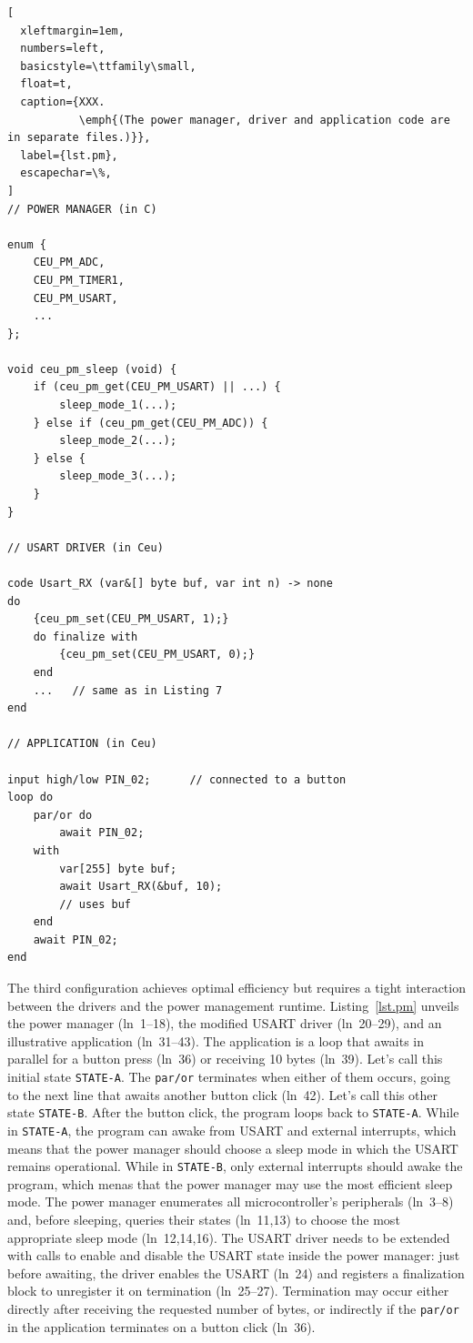 \documentclass[sigplan,10pt,review,anonymous]{acmart}\settopmatter{printfolios=true,printccs=false,printacmref=false}
\newcommand{\code}[1] {{\small{\texttt{#1}}}}
\begin{document}
\begin{lstlisting}[
  xleftmargin=1em,
  numbers=left,
  basicstyle=\ttfamily\small,
  float=t,
  caption={XXX.
           \emph{(The power manager, driver and application code are in separate files.)}},
  label={lst.pm},
  escapechar=\%,
]
// POWER MANAGER (in C)

enum {
    CEU_PM_ADC,
    CEU_PM_TIMER1,
    CEU_PM_USART,
    ...
};

void ceu_pm_sleep (void) {
    if (ceu_pm_get(CEU_PM_USART) || ...) {
        sleep_mode_1(...);
    } else if (ceu_pm_get(CEU_PM_ADC)) {
        sleep_mode_2(...);
    } else {
        sleep_mode_3(...);
    }
}

// USART DRIVER (in Ceu)

code Usart_RX (var&[] byte buf, var int n) -> none
do
    {ceu_pm_set(CEU_PM_USART, 1);}
    do finalize with
        {ceu_pm_set(CEU_PM_USART, 0);}
    end
    ...   // same as in Listing 7
end

// APPLICATION (in Ceu)

input high/low PIN_02;      // connected to a button
loop do
    par/or do
        await PIN_02;
    with
        var[255] byte buf;
        await Usart_RX(&buf, 10);
        // uses buf
    end
    await PIN_02;
end
\end{lstlisting}

The third configuration achieves optimal efficiency but requires a tight
interaction between the drivers and the power management runtime.
%
Listing~\ref{lst.pm} unveils the power manager (ln~1--18), the modified USART
driver (ln~20--29), and an illustrative application (ln~31--43).
%
The application is a loop that awaits in parallel for a button press (ln~36) or
receiving 10 bytes (ln~39).
Let's call this initial state \code{STATE-A}.
The \code{par/or} terminates when either of them occurs, going to the next line
that awaits another button click (ln~42).
Let's call this other state \code{STATE-B}.
After the button click, the program loops back to \code{STATE-A}.
%
While in \code{STATE-A}, the program can awake from USART and external
interrupts, which means that the power manager should choose a sleep mode in
which the USART remains operational.
%
While in \code{STATE-B}, only external interrupts should awake the program,
which menas that the power manager may use the most efficient sleep mode.
%
The power manager enumerates all microcontroller's peripherals (ln~3--8) and,
before sleeping, queries their states (ln~11,13) to choose the most appropriate
sleep mode (ln~12,14,16).
%
The USART driver needs to be extended with calls to enable and disable the
USART state inside the power manager: just before awaiting, the driver enables
the USART (ln~24) and registers a finalization block to unregister it on
termination (ln~25--27).
Termination may occur either directly after receiving the requested number of
bytes, or indirectly if the \code{par/or} in the application terminates on a
button click (ln~36).
\end{document}
